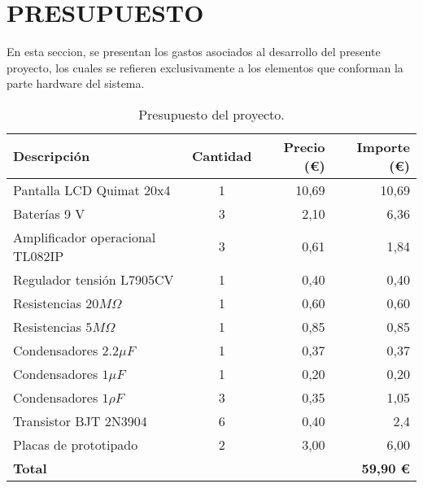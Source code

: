 \chapter*{PRESUPUESTO}
\label{ch:presupuesto}


En esta seccion, se presentan los gastos asociados al desarrollo del presente proyecto, los cuales se refieren exclusivamente a los elementos que conforman la parte hardware del sistema.



\begin{table}[ht]
	\centering
	\begin{tabular}{ |m{7cm}|c|r|r| }
		\hline
		\rowcolor{LightCyan}
		Descripción & Cantidad & Precio (\euro) & Importe (\euro)\\
		\hline
		Pantalla LCD Quimat 20x4 & 1 & 10,69 & 10,69\\
		\hline
		Baterías 9 V & 3 & 2,10 & 6,36\\
		\hline
		Amplificador operacional TL082IP & 3 & 0,61 & 1,84\\
		\hline
		Regulador tensión L7905CV  & 1 & 0,40 &  0,40\\
		\hline
		Resistencias $20 M\Omega$ & 1 & 0,60 & 0,60\\
		\hline
		Resistencias $5M \Omega$ & 1 & 0,85 & 0,85\\
		\hline
		Condensadores $2.2 \mu F$ & 1 & 0,37 & 0,37 \\
		\hline
		Condensadores $1 \mu F$ & 1 & 0,20 & 0,20\\
		\hline
		Condensadores $1 \rho F$ & 3 & 0,35 & 1,05\\
		\hline
		Transistor BJT 2N3904 & 6 & 0,40 & 2,4 \\
		\hline
		Placas de prototipado & 2 & 3,00 & 6,00\\
		\hline
		\textbf{Total} &  &  & \textbf{59,90 \euro}\\
		\hline
	\end{tabular}
	\caption{Presupuesto del proyecto.}
	\label{tabla:presupuesto}
\end{table}
